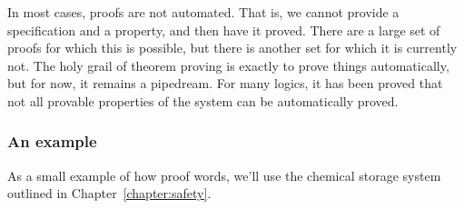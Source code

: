 In most cases, proofs are not automated. That is, we cannot provide a specification and a property, and then have it proved. There are a large set of proofs for which this is possible, but there is another set for which it is currently not. The holy grail of theorem proving is exactly to prove things automatically, but for now, it remains a pipedream. For many logics, it has been proved that not all provable properties of the system can be automatically proved.

\subsubsection*{An example}

As a small example of how proof words, we'll use the chemical storage system outlined in Chapter~\ref{chapter:safety}.

